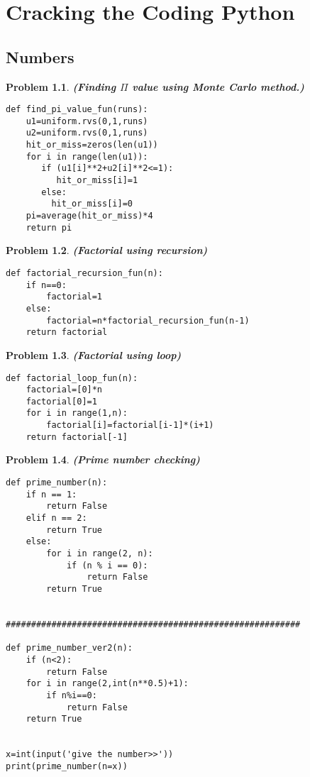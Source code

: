 \documentclass{book}
\newtheorem{problem}{Problem}[section]
\begin{document}
\chapter{Cracking the Coding  Python}

\section{Numbers}
\begin{problem}\textbf{(Finding $\Pi$ value using Monte Carlo method.)}
\begin{verbatim}
def find_pi_value_fun(runs):
    u1=uniform.rvs(0,1,runs)
    u2=uniform.rvs(0,1,runs)
    hit_or_miss=zeros(len(u1))
    for i in range(len(u1)):
       if (u1[i]**2+u2[i]**2<=1):
          hit_or_miss[i]=1
       else:
         hit_or_miss[i]=0
    pi=average(hit_or_miss)*4 
    return pi
\end{verbatim}
\end{problem}

\begin{problem}\textbf{(Factorial using recursion)}
\begin{verbatim}
def factorial_recursion_fun(n):
    if n==0:
        factorial=1
    else:
        factorial=n*factorial_recursion_fun(n-1)
    return factorial
\end{verbatim}
\end{problem}

\begin{problem}\textbf{(Factorial using loop)}
\begin{verbatim}
def factorial_loop_fun(n):
    factorial=[0]*n
    factorial[0]=1
    for i in range(1,n):
        factorial[i]=factorial[i-1]*(i+1)
    return factorial[-1] 
\end{verbatim}
\end{problem}

\begin{problem}\textbf{(Prime number checking)}
\begin{verbatim}
def prime_number(n):
    if n == 1:
        return False
    elif n == 2:
        return True
    else:
        for i in range(2, n):
            if (n % i == 0):
                return False
        return True


##########################################################

def prime_number_ver2(n):
    if (n<2):
        return False
    for i in range(2,int(n**0.5)+1):
        if n%i==0:
            return False
    return True


x=int(input('give the number>>'))
print(prime_number(n=x))
\end{verbatim}
\end{problem}
\end{document}
